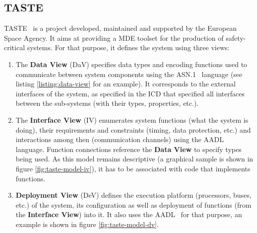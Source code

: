 \documentclass[10pt, conference, compsocconf]{IEEEtran}
\begin{document}
   \subsection{TASTE}
   TASTE~\cite{delange11sdl} is a project developed, maintained and supported by the European Space
   Agency. It aims at providing a MDE toolset for the production
   of safety-critical systems. For that purpose, it defines the system using
   three views:
   \begin{enumerate}
      \item
         The \textbf{Data View} (DaV) specifies data types and encoding functions
         used to communicate between system components using the ASN.1~\cite{dubuisson1999asn} language
         (see listing \ref{listing:data-view} for an example). 
         It corresponds to the external interfaces of the system, as specified in the ICD that specified
         all interfaces between the sub-systems (with their types, properties,
         etc.).
      \item
         The \textbf{Interface View} (IV) enumerates system functions (what the
         system is doing), their requirements and constraints (timing, data protection, etc.)
         and interactions among then (communication channels) using the AADL~\cite{aadl} language. Function connections
         reference the \textbf{Data View} to specify types being used.
         As this model remains descriptive (a graphical sample is shown in
         figure \ref{fig:taste-model-iv}), it has to be associated
         with code that implements functions.
      \item
         \textbf{Deployment View} (DeV) defines the execution platform 
         (processors, buses, etc.) of the system, its configuration 
         as well as deployment of functions (from the \textbf{Interface View}) into it.
         It also uses the AADL~\cite{aadl} for that purpose, an example is shown
         in figure \ref{fig:taste-model-dv}.
   \end{enumerate}
\end{document}
